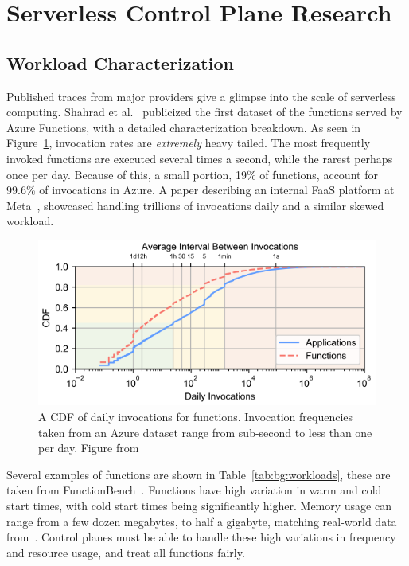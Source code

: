 \section{Serverless Control Plane Research}
\label{sec:related}


\subsection{Workload Characterization}
Published traces from major providers give a glimpse into the scale of serverless computing.
Shahrad et al.~\cite{shahrad_serverless_2020} publicized the first dataset of the functions served by Azure Functions, with a detailed characterization breakdown.
As seen in Figure~\ref{fig:wild-invokes}, invocation rates are \emph{extremely} heavy tailed.
The most frequently invoked functions are executed several times a second, while the rarest perhaps once per day.
Because of this, a small portion, 19\% of functions, account for 99.6\% of invocations in Azure.
A paper describing an internal FaaS platform at Meta~\cite{sahraei2023xfaas}, showcased handling trillions of invocations daily and a similar skewed workload.

\begin{figure}
  \begin{center}
    \includegraphics[width=.9\columnwidth]{./figures/wild-invocations.png}
    \caption{A CDF of daily invocations for functions. 
              Invocation frequencies taken from an Azure dataset range from sub-second to less than one per day. 
              Figure from~\cite{shahrad_serverless_2020}}
  \label{fig:wild-invokes}
\end{center}
\end{figure}


Several examples of functions are shown in Table~\ref{tab:bg:workloads}, these are taken from FunctionBench~\cite{functionbench}.
Functions have high variation in warm and cold start times, with cold start times being significantly higher.
Memory usage can range from a few dozen megabytes, to half a gigabyte, matching real-world data from~\cite{shahrad_serverless_2020}.
Control planes must be able to handle these high variations in frequency and resource usage, and treat all functions fairly.

